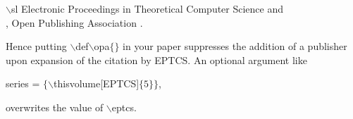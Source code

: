 \documentclass[submission,copyright,creativecommons]{eptcs}
\begin{document}
\noindent
{\small \ttfamily $\backslash$sl Electronic Proceedings in Theoretical Computer Science} \hfill and\\
{\small \ttfamily , Open Publishing Association} \hfill .

\noindent
Hence putting {\small \ttfamily $\backslash$def$\backslash$opa$\{\}$} in
your paper suppresses the addition of a publisher upon expansion of the citation by EPTCS\@.
An optional argument like
\begin{center}
  {\ttfamily series    = $\{\backslash$thisvolume[EPTCS]$\{5\}\}$},
\end{center}
overwrites the value of {\ttfamily \small $\backslash$eptcs}.

\nocite{*}
\printbibliography
\end{document}

